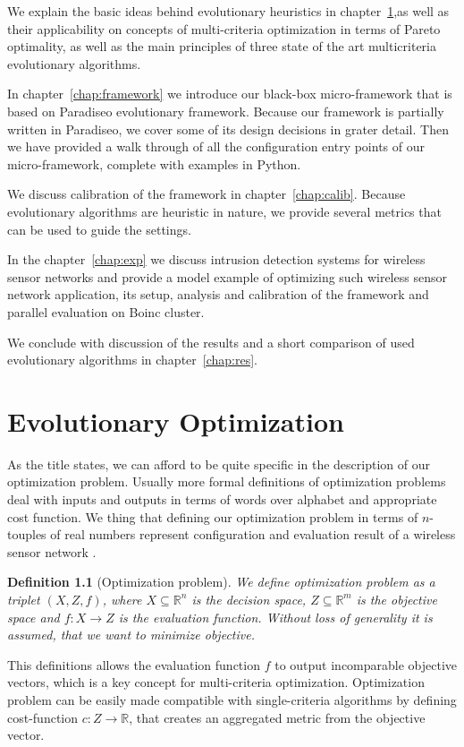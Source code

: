 \documentclass[12pt,oneside]{fithesis2}
\newtheorem{defn}{Definition}
\begin{document}
We explain the basic ideas behind evolutionary heuristics in chapter~\ref{chap:evolution},as well as their applicability on concepts of multi-criteria optimization in terms of Pareto optimality, as well as the main principles of three state of the art multicriteria evolutionary algorithms. 

In chapter~\ref{chap:framework} we introduce our black-box micro-framework that is based on Paradiseo evolutionary framework. Because our framework is partially written in Paradiseo, we cover some of its design decisions in grater detail. Then we have provided a walk through of all the configuration entry points of our micro-framework, complete with examples in Python.

We discuss calibration of the framework in chapter~\ref{chap:calib}. Because evolutionary algorithms are heuristic in nature, we provide several metrics that can be used to guide the settings. 

In the chapter~\ref{chap:exp} we discuss intrusion detection systems for wireless sensor networks and provide a model example of optimizing such wireless sensor network application, its setup, analysis and calibration of the framework and parallel evaluation on Boinc cluster.

We conclude with discussion of the results and a short comparison of used evolutionary algorithms in chapter~\ref{chap:res}.

\chapter{Evolutionary Optimization}
\label{chap:evolution}
As the title states, we can afford to be quite specific in the description of our optimization problem. Usually more formal definitions of optimization problems deal with inputs and outputs in terms of words over alphabet and appropriate cost function. We thing that defining our optimization problem in terms of $n$-touples of real numbers represent configuration and evaluation result of a wireless sensor network . 

\begin{defn}[Optimization problem]
We define optimization problem as a triplet $(X,Z,f)$,
 where $X \subseteq \mathbb{R}^n$ is the decision space,
$Z \subseteq \mathbb{R}^m$ is the objective space and $f:X \to Z$ is the evaluation function.
Without loss of generality it is assumed, that we want to minimize objective.
\end{defn}

This definitions allows the evaluation function $f$ to output incomparable objective vectors, which is a key concept for multi-criteria optimization. Optimization problem can be easily made compatible with single-criteria algorithms by defining cost-function $c:Z \to \mathbb{R}$, that creates an aggregated metric from the objective vector.
\end{document}
